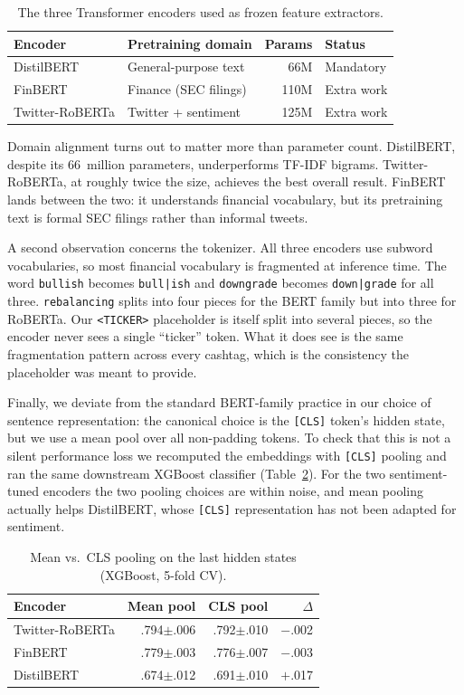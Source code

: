 \documentclass[12pt,a4paper]{article}
\begin{document}
\begin{table}[!htbp]
\centering
\begin{tabular}{llrl}
\toprule
\textbf{Encoder} & \textbf{Pretraining domain} & \textbf{Params} & \textbf{Status} \\
\midrule
DistilBERT       & General-purpose text    & 66M  & Mandatory \\
FinBERT          & Finance (SEC filings)   & 110M & Extra work \\
Twitter-RoBERTa  & Twitter + sentiment     & 125M & Extra work \\
\bottomrule
\end{tabular}
\caption{The three Transformer encoders used as frozen feature extractors.}
\label{tab:transformers}
\end{table}

Domain alignment turns out to matter more than parameter count. DistilBERT, despite its 66~million parameters, underperforms TF-IDF bigrams. Twitter-RoBERTa, at roughly twice the size, achieves the best overall result. FinBERT lands between the two: it understands financial vocabulary, but its pretraining text is formal SEC filings rather than informal tweets.

A second observation concerns the tokenizer. All three encoders use subword vocabularies, so most financial vocabulary is fragmented at inference time. The word \texttt{bullish} becomes \texttt{bull|ish} and \texttt{downgrade} becomes \texttt{down|grade} for all three. \texttt{rebalancing} splits into four pieces for the BERT family but into three for RoBERTa. Our \texttt{<TICKER>} placeholder is itself split into several pieces, so the encoder never sees a single ``ticker'' token. What it does see is the same fragmentation pattern across every cashtag, which is the consistency the placeholder was meant to provide.

Finally, we deviate from the standard BERT-family practice in our choice of sentence representation: the canonical choice is the \texttt{[CLS]} token's hidden state, but we use a mean pool over all non-padding tokens. To check that this is not a silent performance loss we recomputed the embeddings with \texttt{[CLS]} pooling and ran the same downstream XGBoost classifier (Table~\ref{tab:pooling}). For the two sentiment-tuned encoders the two pooling choices are within noise, and mean pooling actually helps DistilBERT, whose \texttt{[CLS]} representation has not been adapted for sentiment.

\begin{table}[!htbp]
\centering
\begin{tabular}{lrrr}
\toprule
\textbf{Encoder} & \textbf{Mean pool} & \textbf{CLS pool} & \textbf{$\Delta$} \\
\midrule
Twitter-RoBERTa & .794$\pm$.006 & .792$\pm$.010 & $-$.002 \\
FinBERT         & .779$\pm$.003 & .776$\pm$.007 & $-$.003 \\
DistilBERT      & .674$\pm$.012 & .691$\pm$.010 & $+$.017 \\
\bottomrule
\end{tabular}
\caption{Mean vs.\ CLS pooling on the last hidden states (XGBoost, 5-fold CV).}
\label{tab:pooling}
\end{table}
\end{document}
